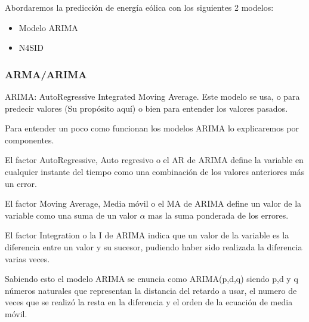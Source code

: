 Abordaremos la predicción de energía eólica con los siguientes 2 modelos:
\begin{itemize}
	\item Modelo ARIMA
	\item N4SID
\end{itemize}


\subsubsection{ARMA/ARIMA}
\label{ssub:arima}

ARIMA: AutoRegressive Integrated Moving Average. Este modelo se usa, o para predecir valores (Su propósito aquí) o bien para entender los valores pasados.

Para entender un poco como funcionan los modelos ARIMA lo explicaremos por componentes.

El factor AutoRegressive, Auto regresivo o el AR de ARIMA define la variable en cualquier instante del tiempo como una combinación de los valores anteriores más un error.

El factor Moving Average, Media móvil o el MA de ARIMA define un valor de la variable como una suma de un valor $\alpha$ mas la suma ponderada de los errores.

El factor Integration o la I de ARIMA indica que un valor de la variable es la diferencia entre un valor y su sucesor, pudiendo haber sido realizada la diferencia varias veces.

Sabiendo esto el modelo ARIMA se enuncia como ARIMA(p,d,q) siendo p,d y q números naturales que representan la distancia del retardo a usar, el numero de veces que se realizó la resta en la diferencia y el orden de la ecuación de media móvil.